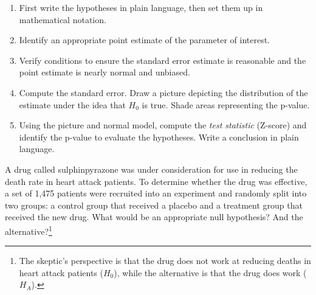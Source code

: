 \begin{termBox}{
\begin{enumerate}
\setlength{\itemsep}{0mm}
\item First write the hypotheses in plain language, then set them up in mathematical notation.
\item Identify an appropriate point estimate of the parameter of interest.
\item Verify conditions to ensure the standard error estimate is reasonable and the point estimate is nearly normal and unbiased.
\item Compute the standard error. Draw a picture depicting the distribution of the estimate under the idea that $H_0$ is true. Shade areas representing the p-value.
\item Using the picture and normal model, compute the \emph{test statistic} (Z-score) and identify the p-value to evaluate the hypotheses. Write a conclusion in plain language.
\end{enumerate}}
\end{termBox}

\begin{exercise} \label{fdaHypSetupForSulph}
A drug called sulphinpyrazone was under consideration for use in reducing the death rate in heart attack patients. To determine whether the drug was effective, a set of 1,475 patients were recruited into an experiment and randomly split into two groups: a control group that received a placebo and a treatment group that received the new drug. What would be an appropriate null hypothesis? And the alternative?\footnote{The skeptic's perspective is that the drug does not work at reducing deaths in heart attack patients ($H_0$), while the alternative is that the drug does work ($H_A$).}
\end{exercise}

\textC{\newpage}

